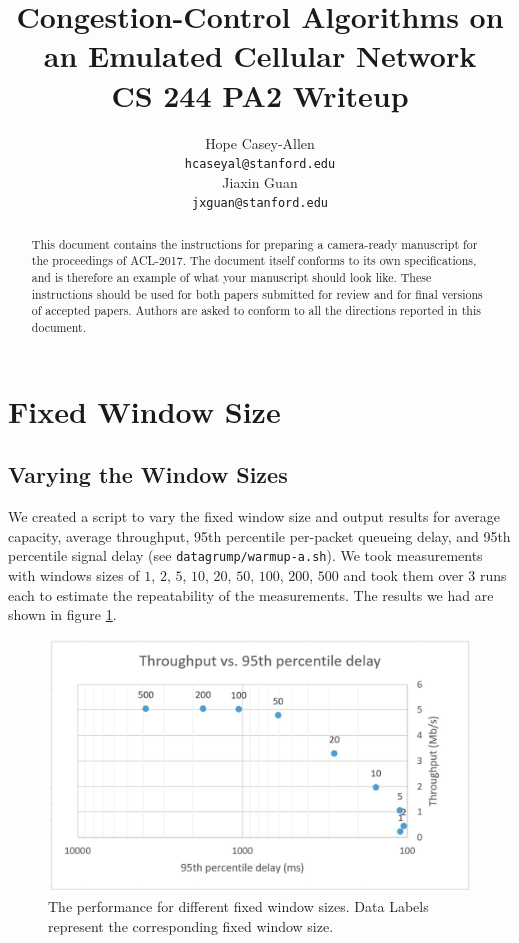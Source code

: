 \documentclass[11pt,a4paper]{article}
\title{ %
  Congestion-Control Algorithms on an Emulated Cellular Network\\
\large CS 244 PA2 Writeup}
\author{Hope Casey-Allen  \\
  {\tt hcaseyal@stanford.edu} \\\And
  Jiaxin Guan \\
  {\tt jxguan@stanford.edu} \\}
\date{}
\begin{document}
\maketitle
\begin{abstract}
  This document contains the instructions for preparing a camera-ready
  manuscript for the proceedings of ACL-2017. The document itself
  conforms to its own specifications, and is therefore an example of
  what your manuscript should look like. These instructions should be
  used for both papers submitted for review and for final versions of
  accepted papers.  Authors are asked to conform to all the directions
  reported in this document.
\end{abstract}



\section{Fixed Window Size}
\label{sec:fixed}

\subsection{Varying the Window Sizes}
We created a script to vary the fixed window size and output results for average
capacity, average throughput, 95th percentile per-packet queueing delay, and
95th percentile signal delay (see \texttt{datagrump/warmup-a.sh}). We took measurements
with windows sizes of $1$, $2$, $5$, $10$, $20$, $50$, $100$, $200$, $500$ and
took them over $3$ runs
each to estimate the repeatability of the measurements. The results we had are
shown in figure \ref{fig:warmup-a}.
\begin{figure}[h]
  \centering
  \includegraphics[scale=0.15]{warmup-a}
  \caption{The performance for different fixed window sizes. Data Labels
  represent the corresponding fixed window size.}
  \label{fig:warmup-a}
\end{figure}
\end{document}

